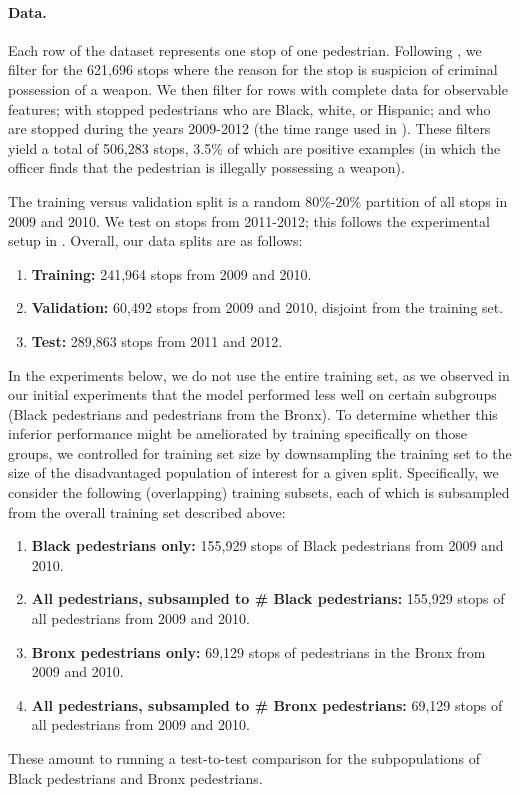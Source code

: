\paragraph{Data.}
Each row of the dataset represents one stop of one pedestrian. Following \citet{goel_precinct_2016}, we filter for the 621,696 stops where the reason for the stop is suspicion of criminal possession of a weapon. We then filter for rows with complete data for observable features; with stopped pedestrians who are Black, white, or Hispanic; and who are stopped during the years 2009-2012 (the time range used in \citet{goel_precinct_2016}). These filters yield a total of 506,283 stops,
3.5\% of which are positive examples (in which the officer finds that the pedestrian is illegally possessing a weapon).

The training versus validation split is a random 80\%-20\% partition of all stops in 2009 and 2010. We test on stops from 2011-2012; this follows the experimental setup in \citet{goel_precinct_2016}. Overall, our data splits are as follows:
\begin{enumerate}
  \item \textbf{Training:} 241,964 stops from 2009 and 2010.
  \item \textbf{Validation:} 60,492 stops from 2009 and 2010, disjoint from the training set.
  \item \textbf{Test:} 289,863 stops from 2011 and 2012.
\end{enumerate}

In the experiments below, we do not use the entire training set,
as we observed in our initial experiments that the model performed less well on certain subgroups (Black pedestrians and pedestrians from the Bronx).
To determine whether this inferior performance might be ameliorated by training specifically on those groups, we controlled for training set size by downsampling the training set to the size of the disadvantaged population of interest for a given split.
Specifically, we consider the following (overlapping) training subsets, each of which is subsampled from the overall training set described above:
\begin{enumerate}
  \item \textbf{Black pedestrians only:} 155,929 stops of Black pedestrians from 2009 and 2010.
  \item \textbf{All pedestrians, subsampled to \# Black pedestrians:} 155,929 stops of all pedestrians from 2009 and 2010.
  \item \textbf{Bronx pedestrians only:} 69,129 stops of pedestrians in the Bronx from 2009 and 2010.
  \item \textbf{All pedestrians, subsampled to \# Bronx pedestrians:} 69,129 stops of all pedestrians from 2009 and 2010.
\end{enumerate}
These amount to running a test-to-test comparison for the subpopulations of Black pedestrians and Bronx pedestrians.

